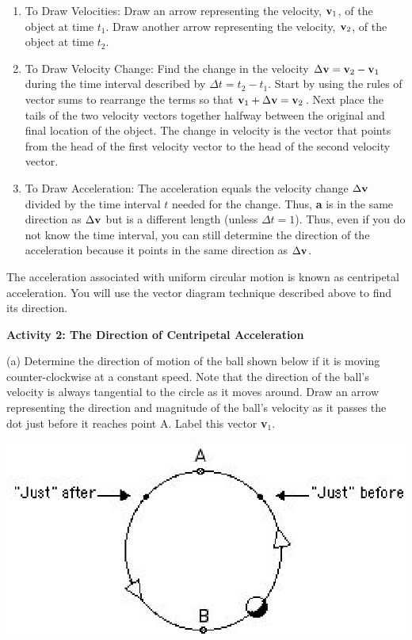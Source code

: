 \begin{enumerate}
\item To Draw Velocities: Draw an arrow representing the velocity, \( 
{\bf v}_{1} \), of
the object at time \( t_{1} \). Draw another arrow representing the velocity,
\( {\bf v}_{2} \), of the object at time \( t_{2} \). 
\item To Draw Velocity Change: Find the change in the velocity 
\( \Delta  {\bf v}
= {\bf v}_{2}  - {\bf v}_{1} \) during the time interval described
by \( \Delta  t = t_{2}  - t_{1} \). Start by using the rules of
vector sums to rearrange the terms so that \({\bf v}_{1}  +  \Delta  
{\bf v}
= {\bf v}_{2} \). Next place the tails of the two velocity vectors together
halfway between the original and final location of the object. The change in
velocity is the vector that points from the head of the first velocity vector
to the head of the second velocity vector. 
\item To Draw Acceleration: The acceleration equals the velocity change 
\( \Delta  {\bf v}\)
divided by the time interval $t$ needed for the change. Thus, \textbf{a} is in
the same direction as \( \Delta  {\bf v}\) but is a different length (unless
\( \Delta  t = 1\)). Thus, even if you do not know the time interval, you
can still determine the direction of the acceleration because it points in the
same direction as \( \Delta  {\bf v}\). 
\end{enumerate}
The acceleration associated with uniform circular motion is known as centripetal
acceleration. You will use the vector diagram technique described above to find
its direction. 

\textbf{Activity 2: The Direction of Centripetal Acceleration }

(a) Determine the direction of motion of the ball shown below if it is moving
counter-clockwise at a constant speed. Note that the direction of the ball's
velocity is always tangential to the circle as it moves around. Draw an arrow
representing the direction and magnitude of the ball's velocity as it passes
the dot just before it reaches point A. Label this vector \textbf{v}\( _{1} \). 

\vspace{0.3cm}
{\par\centering \includegraphics{circ_motion/circ_motion_fig2.eps} \par}
\vspace{0.3cm}

